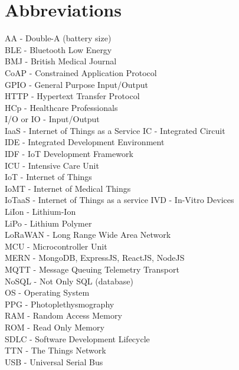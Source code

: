 \chapter{Abbreviations}
AA - Double-A (battery size) \\
BLE - Bluetooth Low Energy\\
BMJ - British Medical Journal\\
CoAP - Constrained Application Protocol \\
GPIO - General Purpose Input/Output\\
HTTP - Hypertext Transfer Protocol\\
HCp - Healthcare Professionals\\
I/O or IO - Input/Output\\
IaaS - Internet of Things as a Service
IC - Integrated Circuit\\
IDE - Integrated Development Environment\\
IDF - IoT Development Framework\\
ICU - Intensive Care Unit\\
IoT - Internet of Things\\
IoMT - Internet of Medical Things\\
IoTaaS - Internet of Things as a service
IVD - In-Vitro Devices\\
LiIon - Lithium-Ion\\
LiPo - Lithium Polymer\\
LoRaWAN - Long Range Wide Area Network\\
MCU - Microcontroller Unit\\
MERN - MongoDB, ExpressJS, ReactJS, NodeJS\\
MQTT - Message Queuing Telemetry Transport\\
NoSQL - Not Only SQL (database)\\
OS - Operating System\\
PPG - Photoplethysmography\\
RAM - Random Access Memory\\
ROM - Read Only Memory\\
SDLC - Software Development Lifecycle\\
TTN - The Things Network\\
USB - Universal Serial Bus\\